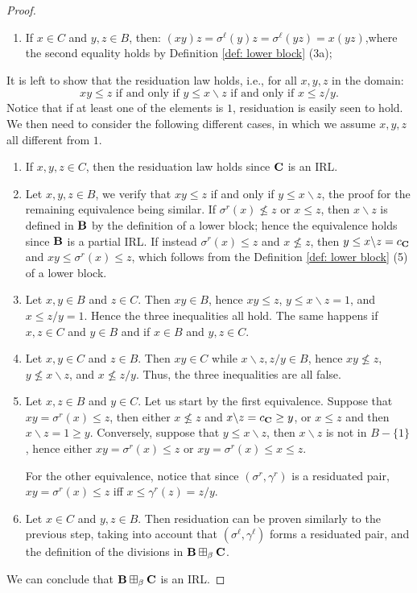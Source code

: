 \documentclass{amsart}
\theoremstyle{definition}
\numberwithin{equation}{section}
\newcommand{\alg}[1]{{\textbf{\upshape #1}}}  %
\newcommand{\sell}{\sigma^\ell}
\newcommand{\sr}{\sigma^r}
\newcommand{\gell}{\gamma^\ell}
\newcommand{\gr}{\gamma^r}
\begin{document}
\begin{proof}
\begin{enumerate}
				\item If $x \in C$ and $y,z \in B$, then: 
				 $(xy)z=\sell(y)z=\sell(yz)=x(yz)$,where the second equality holds by Definition \ref{def: lower block} (3a); 
			\end{enumerate}
	It is left to show that the residuation law holds, i.e., for all $x,y,z$ in the domain: $$xy \leq z \mbox{ if and only if } y \leq x \backslash z \mbox{ if and only if }x \leq z/y.$$ 
	Notice that if at least one of the elements is $1$, residuation is easily seen to hold. We then need to consider the following different cases, in which we assume $x, y, z$ all different from $1$. 
	\begin{enumerate}
	\item If $x,y,z \in C$, then the residuation law holds since $\alg C$ is an IRL.
		\item Let $x,y,z \in B$, we verify that $xy \leq z$ if and only if $y \leq x \backslash z$, the proof for the remaining equivalence being similar. If $\sr(x) \not\leq z$ or $x \leq z$, then $x \backslash z$ is defined in $\alg B$ by the definition of a lower block; hence the equivalence holds since $\alg B$ is a partial IRL. If instead $\sr(x) \leq z$ and $x \not\leq z$,	 then $y \leq x \backslash z=c_{\alg C}$ and $xy \leq \sr(x)\leq z$, which follows from the Definition \ref{def: lower block} (5) of a lower block.
		\item Let $x,y \in B$ and $z \in C$. Then $xy \in B$, hence $xy \leq z$, $y \leq x \backslash z = 1$, and $x \leq z/y = 1$. Hence the three inequalities all hold. The same happens if $x,z \in C$ and $y \in B$ and if $x \in B$ and $y,z \in C$.
		\item Let $x,y \in C$ and $z \in B$. Then $xy \in C$ while $x \backslash z, z / y \in B$, hence $xy \not\leq z$, $y \not\leq x \backslash z$, and $x \not\leq z/y$. Thus, the three inequalities are all false. 
		\item Let $x,z \in B$ and $y \in C$. Let us start by the first equivalence. Suppose that $xy=\sr(x)\leq z$, then either $x \not\leq z$ and $x \backslash z= c_{\alg C}\geq y$, or $x \leq z$ and then $x \backslash z=1 \geq y$. Conversely, suppose that $y \leq x\backslash z$, then $x\backslash z$ is not in $B-\{1\}$, hence either $xy = \sr(x)\leq z$ or $xy = \sr(x) \leq x \leq z$.
	
		For the other equivalence, notice that since $(\sr, \gr)$ is a residuated pair, $xy = \sr(x)\leq z$ iff $x \leq \gr(z)=z/y$.  
		\item Let $x \in C$ and $y,z \in B$. Then residuation can be proven similarly to the previous step, taking into account that $(\sell, \gell)$ forms a residuated pair, and the definition of the divisions in $\alg B \boxplus_\beta \alg C$.
     \end{enumerate}		
     
	We can conclude that $\alg B \boxplus_\beta \alg C$ is an IRL. 
	\end{proof}
\end{document}
